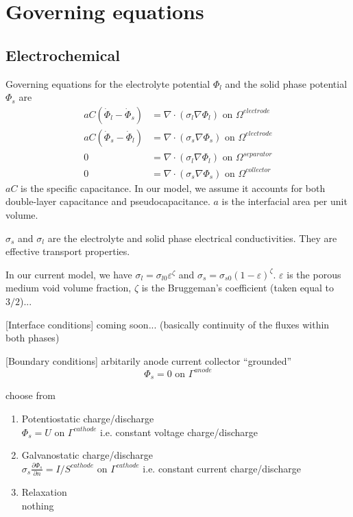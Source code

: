 \documentclass[10pt, oneside]{article}   	%
\begin{document}
\section{Governing equations}
\subsection{Electrochemical}

Governing equations for the electrolyte potential $\Phi_l$ and the solid phase
potential $\Phi_s$ are
\begin{align}
aC (\dot{\Phi}_l - \dot{\Phi}_s) &= \nabla \cdot (\sigma_l \nabla \Phi_l) \text{ on } \Omega^{electrode} \\
aC (\dot{\Phi}_s - \dot{\Phi}_l) &= \nabla \cdot (\sigma_s \nabla \Phi_s) \text{ on } \Omega^{electrode} \\
0 &= \nabla \cdot (\sigma_l \nabla \Phi_l) \text{ on } \Omega^{separator} \\
0 &= \nabla \cdot (\sigma_s \nabla \Phi_s) \text{ on } \Omega^{collector}
\end{align}
$aC$ is the specific capacitance. In our model, we assume it accounts for both 
double-layer capacitance and pseudocapacitance. $a$ is the interfacial area
per unit volume.

$\sigma_s$ and $\sigma_l$ are the electrolyte and solid phase electrical
conductivities. They are effective transport properties.

In our current model, we have
$\sigma_l=\sigma_{l0}\varepsilon^\zeta$ and
$\sigma_s=\sigma_{s0}(1-\varepsilon)^\zeta$.
$\varepsilon$ is the porous medium void volume fraction,
$\zeta$ is the Bruggeman's coefficient (taken equal to $3/2$)...

[Interface conditions]
coming soon... (basically continuity of the fluxes within both phases)

[Boundary conditions]
arbitarily anode current collector ``grounded''
\begin{equation}
\Phi_s = 0 \text{\ on\ } \Gamma^{anode}
\end{equation}

choose from
\begin{enumerate}
\item Potentiostatic charge/discharge \\
$\Phi_s = U \text{\ on\ } \Gamma^{cathode}$
i.e. constant voltage charge/discharge

\item Galvanostatic charge/discharge \\
$\sigma_s \frac{\partial \Phi_s}{\partial n} = I / S^{cathode} \text{\ on\ } \Gamma^{cathode}$
i.e. constant current charge/discharge

\item Relaxation \\
nothing
\end{enumerate}
\end{document}
